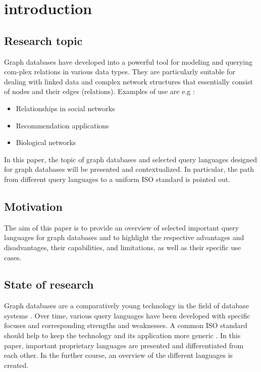 \chapter{introduction}
\label{ch:intro}

\section{Research topic}
\label{sec:intro:research_topic}
Graph databases have developed into a powerful tool for modeling and querying com-plex relations in various data types. 
They are particularly suitable for dealing with linked data and complex network structures that essentially consist of nodes and their edges (relations). 
Examples of use are e.g \citep{yuanyuan_tian_world_2022}:
\begin{itemize}
	\item Relationships in social networks
	\item Recommendation applications
	\item Biological networks
\end{itemize}
In this paper, the topic of graph databases and selected query languages designed for graph databases will be presented and contextualized. 
In particular, 
the path from different query languages to a uniform ISO standard is pointed out.


\section{Motivation}
\label{sec:intro:motivation}
The aim of this paper is to provide an overview of selected important 
query languages for graph databases and to highlight the respective advantages and disadvantages, 
their capabilities, and limitations, as well as their specific use cases. 

\section{State of research}
\label{sec:intro:state_of_research}
Graph databases are a comparatively young technology in the field of database systems \citep{hare_isoiec_2024}.  
Over time, various query languages have been developed with specific focuses and corresponding strengths and weaknesses.
A common ISO standard should help to keep the technology and its application more generic \citep{duckham_matt_gis_2024}.
In this paper, important proprietary languages are presented and differentiated from each other. 
In the further course, an overview of the different languages is created.

